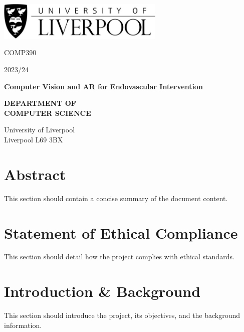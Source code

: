 \documentclass[12pt]{article}
\begin{document}
\newpage
\begin{titlepage}
    \centering

    
    \includegraphics[width=0.6\textwidth]{Liverpool.jpg} %
    \vspace*{1cm}

    \Large
    COMP390

    \large
    2023/24

    \vspace{4.5cm}
    \Huge
    \textbf{Computer Vision and AR for Endovascular Intervention}

    \vspace{1.5cm}



    \vspace{4cm} %
    \Large
    \textbf{DEPARTMENT OF}\\
    \vspace{0.1cm} %
    \textbf{COMPUTER SCIENCE}

    \vspace{1cm} %
    \large
    University of Liverpool\\
    Liverpool L69 3BX


\end{titlepage}
\tableofcontents
\newpage

\section*{Abstract}
This section should contain a concise summary of the document content.

\section*{Statement of Ethical Compliance}
This section should detail how the project complies with ethical standards.

\newpage

\section{Introduction \& Background}
This section should introduce the project, its objectives, and the background information.
\end{document}
